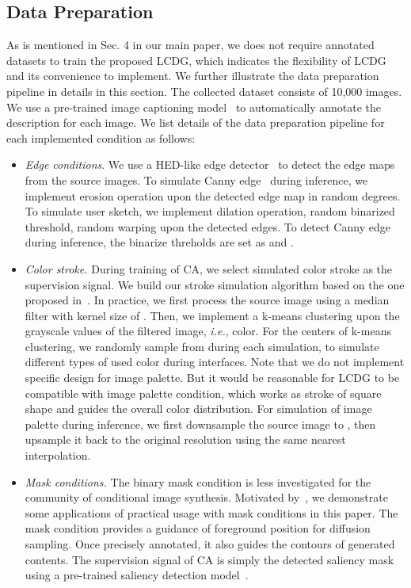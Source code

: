 \documentclass{article}
\begin{document}
\subsection{Data Preparation}
\label{subsection:data preparation}
As is mentioned in Sec. 4 in our main paper, we does not require annotated datasets to train the proposed LCDG, which indicates the flexibility of LCDG and its convenience to implement. We further illustrate the data preparation pipeline in details in this section. The collected dataset consists of 10,000 images. We use a pre-trained image captioning model~\cite{hu2022expansionnet} to automatically annotate the description for each image. We list details of the data preparation pipeline for each implemented condition as follows:
\begin{itemize}
\item \textit{Edge conditions}. We use a HED-like edge detector~\cite{he2020bdcn} to detect the edge maps from the source images. To simulate Canny edge~\cite{canny1986computational} during inference, we implement erosion operation upon the detected edge map in random degrees. To simulate user sketch, we implement dilation operation, random binarized threshold, random warping upon the detected edges. To detect Canny edge during inference, the binarize threholds are set as  and .
  \item \textit{Color stroke.} During training of CA, we select simulated color stroke as the supervision signal. We build our stroke simulation algorithm based on the one proposed in~\cite{meng2021sdedit}. In practice, we first process the source image using a median filter with kernel size of . Then, we implement a k-means clustering upon the grayscale values of the filtered image, \textit{i.e.}, color. For the centers of k-means clustering, we randomly sample  from  during each simulation, to simulate different types of used color during interfaces. Note that we do not implement specific design for image palette. But it would be reasonable for LCDG to be compatible with image palette condition, which works as stroke of square shape and guides the overall color distribution. For simulation of image palette during inference, we first downsample the source image to , then upsample it back to the original resolution using the same nearest interpolation.
  \item \textit{Mask conditions.} The binary mask condition is less investigated for the community of conditional image synthesis. Motivated by~\cite{huang2023composer}, we demonstrate some applications of practical usage with mask conditions in this paper. The mask condition provides a guidance of foreground position for diffusion sampling. Once precisely annotated, it also guides the contours of generated contents. The supervision signal of CA is simply the detected saliency mask using a pre-trained saliency detection model~\cite{qin2020u2}.
\end{itemize}
\end{document}

